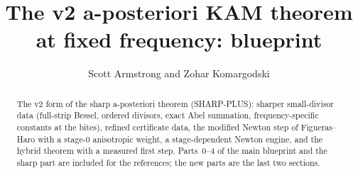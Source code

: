 \documentclass[11pt]{amsart}
\title{The v2 a-posteriori KAM theorem at fixed frequency: blueprint}
\author{Scott Armstrong and Zohar Komargodski}
\begin{document}
\begin{abstract}
The v2 form of the sharp a-posteriori theorem (SHARP-PLUS): sharper small-divisor data (full-strip Bessel, ordered divisors, exact Abel
summation, frequency-specific constants at the bites), refined certificate data, the modified Newton step of Figueras--Haro with a stage-0
anisotropic weight, a stage-dependent Newton engine, and the hybrid theorem with a measured first step. Parts~0--4 of the main blueprint and the
sharp part are included for the references; the new parts are the last two sections.
\end{abstract}
\maketitle
\tableofcontents








\end{document}
